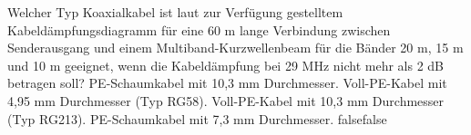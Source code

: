     {Welcher Typ Koaxialkabel ist laut zur Verfügung gestelltem Kabeldämpfungsdiagramm für eine 60 m lange Verbindung zwischen Senderausgang und einem Multiband-Kurzwellenbeam für die Bänder 20 m, 15 m und 10 m geeignet, wenn die Kabeldämpfung bei 29 MHz nicht mehr als 2 dB betragen soll?}
    {PE-Schaumkabel mit 10,3 mm Durchmesser.}
    {Voll-PE-Kabel mit 4,95 mm Durchmesser (Typ RG58).}
    {Voll-PE-Kabel mit 10,3 mm Durchmesser (Typ RG213).}
    {PE-Schaumkabel mit 7,3 mm Durchmesser.}
    {false}{false}
